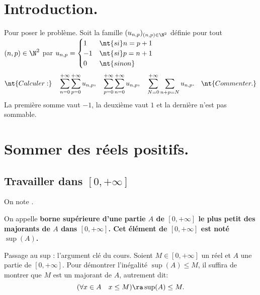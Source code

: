 \documentclass[11pt]{article}
\begin{document}


\section*{Introduction.}

\begin{ex}{Pour poser le problème.}{}
    Soit la famille $(u_{n,p})_{(n,p)\in\N^2}$ définie pour tout $(n,p)\in\N^2$ par $u_{n,p}=\begin{cases}
        1 & \nt{si } n=p+1\\
        -1 & \nt{si } p=n+1\\
        0 & \nt{sinon}
    \end{cases}$
    \begin{equation*}
        \nt{Calculer:} \quad \sum_{n=0}^{+\infty}\sum_{p=0}^{+\infty}u_{n,p}, \quad \sum_{p=0}^{+\infty}\sum_{n=0}^{+\infty}u_{n,p}, \quad \sum_{N=0}^{+\infty}\sum_{n+p=N}u_{n,p}. \quad \nt{Commenter.}
    \end{equation*}
    \tcblower
    La première somme vaut $-1$, la deuxième vaut $1$ et la dernière n'est pas sommable.
\end{ex}

\section{Sommer des réels positifs.}
\setcounter{subsection}{-1}
\subsection{Travailler dans \texorpdfstring{$[0,+\infty]$}{Lg}}

On note \fbox{$[0,+\infty]=\R_+\cup\{+\infty\}$}.

\begin{defi}{}{}
    On appelle \bf{borne supérieure} d'une partie $A$ de $[0,+\infty]$ le plus petit des majorants de $A$ dans $[0,+\infty]$. Cet élément de $[0,+\infty]$ est noté $\sup(A)$.
\end{defi}

\begin{meth}{Passage au sup : l'argument clé du cours.}{}
    Soient $M\in[0,+\infty]$ un réel et $A$ une partie de $[0,+\infty]$. Pour démontrer l'inégalité $\sup(A)\leq M$, il suffira de montrer que $M$ est un majorant de $A$, autrement dit:
    \begin{equation*}
        (\forall x \in A\quad x\leq M) \ra \sup(A) \leq M.
    \end{equation*}
\end{meth}
\end{document}
